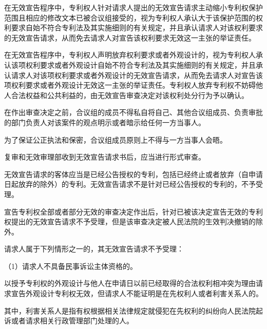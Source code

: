 在无效宣告程序中，专利权人针对请求人提出的无效宣告请求主动缩小专利权保护范围且相应的修改文本已被合议组接受的，视为专利权人承认大于该保护范围的权利要求自始不符合专利法及其实施细则的有关规定，并且承认请求人对该权利要求的无效宣告请求，从而免去请求人对宣告该权利要求无效这一主张的举证责任。

在无效宣告程序中，专利权人声明放弃权利要求或者外观设计的，视为专利权人承认该项权利要求或者外观设计自始不符合专利法及其实施细则的有关规定，并且承认请求人对该项权利要求或者外观设计的无效宣告请求，从而免去请求人对宣告该项权利要求或者外观设计无效这一主张的举证责任。专利权人放弃专利权不妨碍他人合法权益和公共利益的，由无效宣告审查决定对该权利处分行为予以确认。

在作出审查决定之前，合议组的成员不得私自将自己、其他合议组成员、负责审批的部门负责人对该案件的观点明示或者暗示给任何一方当事人。

为了保证公正执法和保密，合议组成员原则上不得与一方当事人会晤。

复审和无效审理部收到无效宣告请求书后，应当进行形式审查。

无效宣告请求的客体应当是已经公告授权的专利，包括已经终止或者放弃（自申请日起放弃的除外）的专利。无效宣告请求不是针对已经公告授权的专利的，不予受理。

宣告专利权全部或者部分无效的审查决定作出后，针对已被该决定宣告无效的专利权提出的无效宣告请求不予受理，但是该审查决定被人民法院的生效判决撤销的除外。

请求人属于下列情形之一的，其无效宣告请求不予受理：

{\setlength{\parindent}{17.1bp}（1）请求人不具备民事诉讼主体资格的。\par}

{\setlength{\parindent}{17.5bp}\par}

{\setlength{\parindent}{17.1bp}以授予专利权的外观设计与他人在申请日以前已经取得的合法权利相冲突为理由请求宣告外观设计专利权无效，但请求人不能证明是在先权利人或者利害关系人的。\par}

其中，利害关系人是指有权根据相关法律规定就侵犯在先权利的纠纷向人民法院起诉或者请求相关行政管理部门处理的人。


